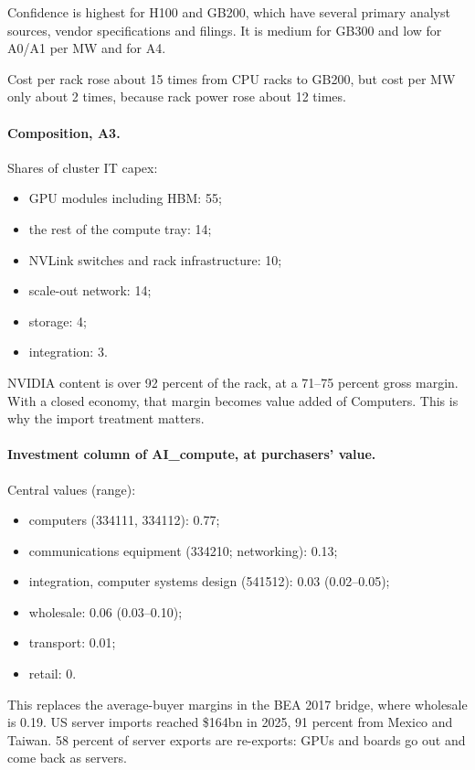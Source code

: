 Confidence is highest for H100 and GB200, which have several primary analyst sources, vendor
specifications and filings. It is medium for GB300 and low for A0/A1 per MW and for A4.

Cost per rack rose about 15 times from CPU racks to GB200, but cost per MW only about 2 times,
because rack power rose about 12 times.

\paragraph{Composition, A3.} Shares of cluster IT capex:
\begin{itemize}
  \item GPU modules including HBM: 55;
  \item the rest of the compute tray: 14;
  \item NVLink switches and rack infrastructure: 10;
  \item scale-out network: 14;
  \item storage: 4;
  \item integration: 3.
\end{itemize}
NVIDIA content is over 92 percent of the rack, at a 71--75 percent gross margin. With a closed
economy, that margin becomes value added of Computers. This is why the import treatment matters.

\paragraph{Investment column of AI\_compute, at purchasers' value.} Central values (range):
\begin{itemize}
  \item computers (334111, 334112): 0.77;
  \item communications equipment (334210; networking): 0.13;
  \item integration, computer systems design (541512): 0.03 (0.02--0.05);
  \item wholesale: 0.06 (0.03--0.10);
  \item transport: 0.01;
  \item retail: 0.
\end{itemize}
This replaces the average-buyer margins in the BEA 2017 bridge, where wholesale is 0.19. US
server imports reached \$164bn in 2025, 91 percent from Mexico and Taiwan. 58 percent of server
exports are re-exports: GPUs and boards go out and come back as servers.

